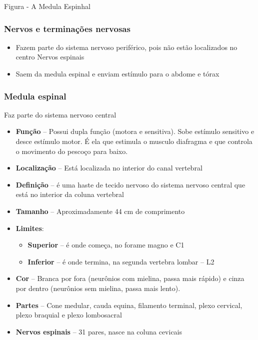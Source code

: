 \documentclass[
]{book}
\providecommand{\tightlist}{%
  \setlength{\itemsep}{0pt}\setlength{\parskip}{0pt}}
\begin{document}
Figura - A Medula Espinhal

\hypertarget{nervos-e-terminauxe7uxf5es-nervosas}{%
\subsubsection{Nervos e terminações nervosas}\label{nervos-e-terminauxe7uxf5es-nervosas}}

\begin{itemize}
\tightlist
\item
  Fazem parte do sistema nervoso periférico, pois não estão localizados no centro
  Nervos espinais
\item
  Saem da medula espinal e enviam estímulo para o abdome e tórax
\end{itemize}

\hypertarget{medula-espinal}{%
\subsubsection{Medula espinal}\label{medula-espinal}}

Faz parte do sistema nervoso central

\begin{itemize}
\tightlist
\item
  \textbf{Função} -- Possui dupla função (motora e sensitiva). Sobe estímulo sensitivo e desce estímulo motor. É ela
  que estimula o musculo diafragma e que controla o movimento do pescoço para baixo.
\item
  \textbf{Localização} -- Está localizada no interior do canal vertebral
\item
  \textbf{Definição} -- é uma haste de tecido nervoso do sistema nervoso central que está no interior da coluna vertebral
\item
  \textbf{Tamanho} -- Aproximadamente 44 cm de comprimento
\item
  \textbf{Limites}:

  \begin{itemize}
  \tightlist
  \item
    \textbf{Superior} -- é onde começa, no forame magno e C1
  \item
    \textbf{Inferior} -- é onde termina, na segunda vertebra lombar -- L2
  \end{itemize}
\item
  \textbf{Cor} -- Branca por fora (neurônios com mielina, passa mais rápido) e cinza por dentro (neurônios sem mielina, passa mais lento).
\item
  \textbf{Partes} -- Cone medular, cauda equina, filamento terminal, plexo cervical, plexo braquial e plexo lombosacral
\item
  \textbf{Nervos espinais} -- 31 pares, nasce na coluna cevicais
\end{itemize}
\end{document}
